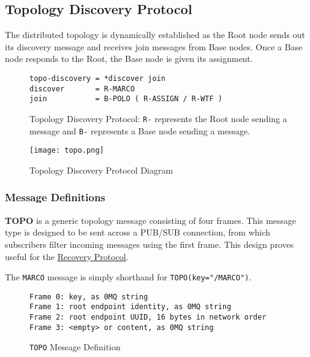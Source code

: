 \subsection{Topology Discovery Protocol}
\label{proto_topo}

The \dcamp distributed topology is dynamically established as the Root node sends out its discovery message and receives
join messages from Base nodes. Once a Base node responds to the Root, the Base node is given its assignment.

\begin{figure}[ht]
\vspace{+10pt}
\begin{verbatim}
topo-discovery = *discover join
discover       = R-MARCO
join           = B-POLO ( R-ASSIGN / R-WTF )
\end{verbatim}
\vspace{-5pt}
\caption[Topology Discovery Protocol]
        {Topology Discovery Protocol: \texttt{R-} represents the Root node sending a message and \texttt{B-}
         represents a Base node sending a message.}
\label{fig:proto_topo_spec}
\end{figure}

\begin{figure}[ht]
    \centering
    \texttt{[image: topo.png]}
    \label{fig:proto_topo_image}
    \caption{Topology Discovery Protocol Diagram}
\end{figure}

\subsubsection{Message Definitions}

\textbf{TOPO} is a generic topology message consisting of four frames. This message type is designed to be sent across a
PUB/SUB connection, from which subscribers filter incoming messages using the first frame. This design proves useful for
the \hyperref[proto_reco]{Recovery Protocol}.

The \texttt{MARCO} message is simply shorthand for \texttt{TOPO(key="/MARCO")}.

\begin{figure}[ht]
\vspace{+10pt}
\begin{verbatim}
Frame 0: key, as 0MQ string
Frame 1: root endpoint identity, as 0MQ string
Frame 2: root endpoint UUID, 16 bytes in network order
Frame 3: <empty> or content, as 0MQ string
\end{verbatim}
\vspace{-20pt}
\caption{\texttt{TOPO} Message Definition}
\label{fig:message_topo}
\end{figure}

